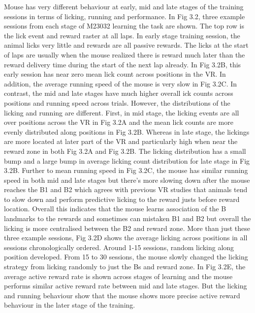 Mouse has very different behaviour at early, mid and late stages of the training sessions in terms of licking, running and performance. In Fig 3.2, three example sessions from each stage of M23032 learning the task are shown. The top row is the lick event and reward raster at all laps. In early stage training session, the animal licks very little and rewards are all passive rewards. The licks at the start of laps are usually when the mouse realized there is reward much later than the reward delivery time during the start of the next lap already. In Fig 3.2B, this early session has near zero mean lick count across positions in the VR. In addition, the average running speed of the mouse is very slow in Fig 3.2C. In contrast, the mid and late stages have much higher overall ick counts across positions and running speed across trials. However, the distributions of the licking and running are different. First, in mid stage, the licking events are all over positions across the VR in Fig 3.2A and the mean lick counts are more evenly distributed along positions in Fig 3.2B. Whereas in late stage, the lickings are more located at later part of the VR and particularly high when near the reward zone in both Fig 3.2A and Fig 3.2B. The licking distribution has a small bump and a large bump in average licking count distribution for late stage in Fig 3.2B. Further to mean running speed in Fig 3.2C, the mouse has similar running speed in both mid and late stages but there's more slowing down after the mouse reaches the B1 and B2 which agrees with previous VR studies that animals tend to slow down and perform predictive licking to the reward justs before reward location. Overall this indicates that the mouse learns association of the B landmarks to the rewards and sometimes can mistaken B1 and B2 but overall the licking is more centralised between the B2 and reward zone. More than just these three example sessions, Fig 3.2D shows the average licking across positions in all sessions chronologically ordered. Around 1-15 sessions, random licking along position developed. From 15 to 30 sessions, the mouse slowly changed the licking strategy from licking randomly to just the Bs and reward zone. In Fig 3.2E, the average active reward rate is shown across stages of learning and the mouse performs similar active reward rate between mid and late stages. But the licking and running behaviour show that the mouse shows more precise active reward behaviour in the later stage of the training.

